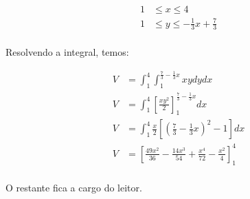 \documentclass{article}
\theoremstyle{definition}
\begin{document}
        \begin{align*}
            1 &\leq x \leq 4\\
            1 &\leq y \leq -\frac{1}{3}x + \frac{7}{3}\\
        \end{align*}

        Resolvendo a integral, temos:

        \begin{align*}
            V &= \int_1^4 \int_1^{\frac{7}{3} - \frac{1}{3}x} xy dy dx\\
            V &= \int_1^4 \left[ \frac{xy^2}{2} \right]_1^{\frac{7}{3} - \frac{1}{3}x} dx\\
            V &= \int_1^4 \frac{x}{2} \left[ \left( \frac{7}{3} - \frac{1}{3}x \right)^2 - 1 \right] dx\\
            V &= \left[ \frac{49x^2}{36} - \frac{14x^3}{54} + \frac{x^4}{72} - \frac{x^2}{4} \right]_1^4\\
        \end{align*}

        O restante fica a cargo do leitor.
\end{document}
